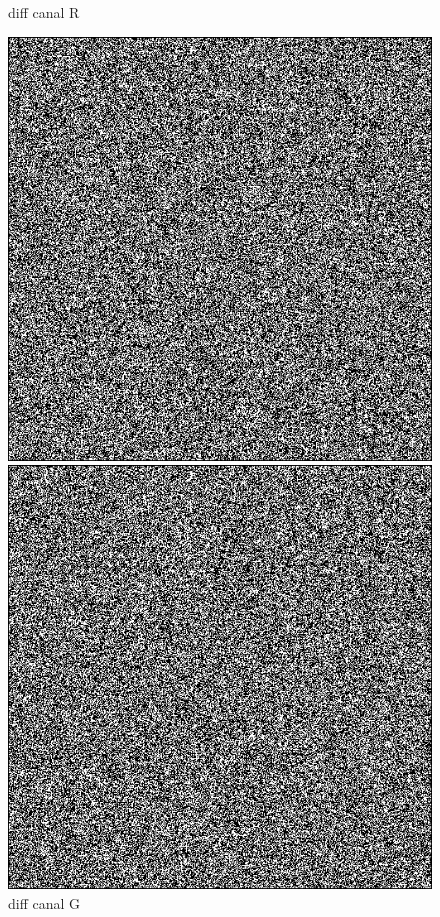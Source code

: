 \begin{figure}[H]
  \caption{diff canal R}
\endminipage\hfill
{}
  \includegraphics[width=\linewidth]{images/lenablurdiffG.png}
  \caption{diff canal G}
\endminipage\hfill
{}
  \includegraphics[width=\linewidth]{images/lenablurdiffB.png}

\end{figure}
